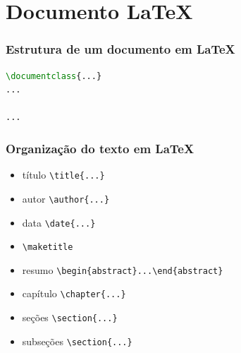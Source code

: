\section{Documento \LaTeX{}}
\begin{frame}[fragile]
\frametitle{Estrutura de um documento em \LaTeX{}}
\begin{lstlisting}[language=tex, label=lst-estrutura, caption={Estrutura de um documento em \LaTeX{}}, postbreak=\mbox{$\hookrightarrow$\space}]
\documentclass{...}
...

...

\end{lstlisting} %
\end{frame}

\begin{frame}[fragile]
\frametitle{Organização do texto em \LaTeX{}}
\begin{itemize}
\item título \verb|\title{...}|
\item autor \verb|\author{...}|
\item data \verb|\date{...}|
\item \verb|\maketitle|
\end{itemize}
\vspace{3ex}
\begin{itemize}
\item resumo \verb|\begin{abstract}...\end{abstract}|
\item capítulo \verb|\chapter{...}|
\item seções \verb|\section{...}|
\item subseções \verb|\section{...}|
\end{itemize}
\end{frame}


